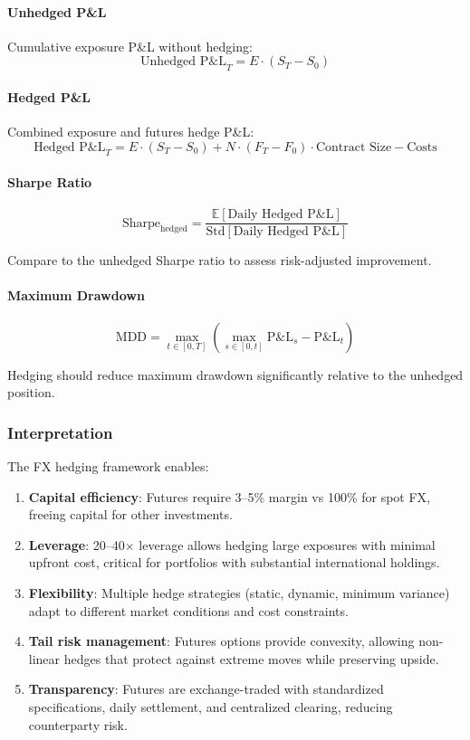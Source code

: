 \paragraph{Unhedged P\&L}

Cumulative exposure P\&L without hedging:
\[
\text{Unhedged P\&L}_T = E \cdot (S_T - S_0)
\]

\paragraph{Hedged P\&L}

Combined exposure and futures hedge P\&L:
\[
\text{Hedged P\&L}_T = E \cdot (S_T - S_0) + N \cdot (F_T - F_0) \cdot \text{Contract Size} - \text{Costs}
\]

\paragraph{Sharpe Ratio}

\[
\text{Sharpe}_{\text{hedged}} = \frac{\mathbb{E}[\text{Daily Hedged P\&L}]}{\text{Std}[\text{Daily Hedged P\&L}]}
\]

Compare to the unhedged Sharpe ratio to assess risk-adjusted improvement.

\paragraph{Maximum Drawdown}

\[
\text{MDD} = \max_{t \in [0, T]} \left( \max_{s \in [0, t]} \text{P\&L}_s - \text{P\&L}_t \right)
\]

Hedging should reduce maximum drawdown significantly relative to the unhedged position.

\subsubsection{Interpretation}

The FX hedging framework enables:

\begin{enumerate}
  \item \textbf{Capital efficiency}: Futures require 3--5\% margin vs 100\% for spot FX, freeing capital for other investments.

  \item \textbf{Leverage}: 20--40$\times$ leverage allows hedging large exposures with minimal upfront cost, critical for portfolios with substantial international holdings.

  \item \textbf{Flexibility}: Multiple hedge strategies (static, dynamic, minimum variance) adapt to different market conditions and cost constraints.

  \item \textbf{Tail risk management}: Futures options provide convexity, allowing non-linear hedges that protect against extreme moves while preserving upside.

  \item \textbf{Transparency}: Futures are exchange-traded with standardized specifications, daily settlement, and centralized clearing, reducing counterparty risk.
\end{enumerate}


